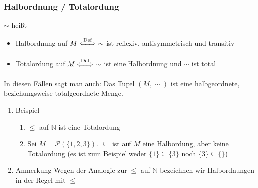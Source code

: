 \documentclass[11pt]{article}
\begin{document}
\subsubsection{Halbordnung / Totalordung}
\label{sec-2-5-3}
$\sim$ heißt
\begin{itemize}
\item Halbordnung auf $M\xLeftrightarrow{\text{Def}}~\sim$ ist reflexiv, antisymmetrisch und transitiv
\item Totalordung auf $M\xLeftrightarrow{\text{Def}}~\sim$ ist eine Halbordnung und $\sim$ ist total
\end{itemize}
In diesen Fällen sagt man auch: Das Tupel $(M,\sim)$ ist eine halbgeordnete, beziehungsweise totalgeordnete Menge.
\begin{enumerate}
\item Beispiel
\label{sec-2-5-3-1}
\begin{enumerate}
\item $\leq$ auf $\mathbb{N}$ ist eine Totalordung
\item Sei $M = \mathcal{P}(\{1,2,3\})$. $\subseteq$ ist auf $M$ eine Halbordung, aber keine Totalordung (es ist zum Beispiel weder $\{1\} \subseteq \{3\}$ noch $\{3\}\subseteq \{\}$)
\end{enumerate}
\item Anmerkung
\label{sec-2-5-3-2}
Wegen der Analogie zur $\leq$ auf $\mathbb{N}$ bezeichnen wir Halbordnungen in der Regel mit $\leq$
\end{enumerate}
\end{document}
